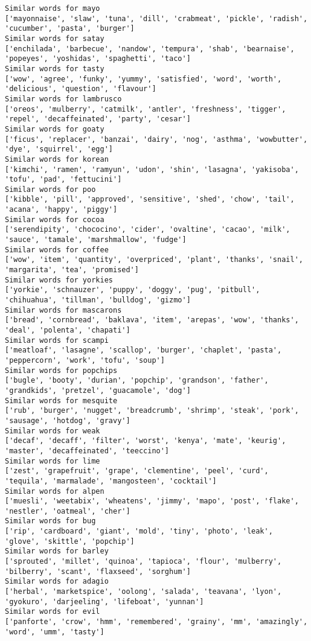 \documentclass[11pt]{article}
\begin{document}
\begin{Verbatim}[commandchars=\\\{\}]
Similar words for mayo
['mayonnaise', 'slaw', 'tuna', 'dill', 'crabmeat', 'pickle', 'radish', 'cucumber', 'pasta', 'burger']
Similar words for satay
['enchilada', 'barbecue', 'nandow', 'tempura', 'shab', 'bearnaise', 'popeyes', 'yoshidas', 'spaghetti', 'taco']
Similar words for tasty
['wow', 'agree', 'funky', 'yummy', 'satisfied', 'word', 'worth', 'delicious', 'question', 'flavour']
Similar words for lambrusco
['oreos', 'mulberry', 'catmilk', 'antler', 'freshness', 'tigger', 'repel', 'decaffeinated', 'party', 'cesar']
Similar words for goaty
['ficus', 'replacer', 'banzai', 'dairy', 'nog', 'asthma', 'wowbutter', 'dye', 'squirrel', 'egg']
Similar words for korean
['kimchi', 'ramen', 'ramyun', 'udon', 'shin', 'lasagna', 'yakisoba', 'tofu', 'pad', 'fettucini']
Similar words for poo
['kibble', 'pill', 'approved', 'sensitive', 'shed', 'chow', 'tail', 'acana', 'happy', 'piggy']
Similar words for cocoa
['serendipity', 'chococino', 'cider', 'ovaltine', 'cacao', 'milk', 'sauce', 'tamale', 'marshmallow', 'fudge']
Similar words for coffee
['wow', 'item', 'quantity', 'overpriced', 'plant', 'thanks', 'snail', 'margarita', 'tea', 'promised']
Similar words for yorkies
['yorkie', 'schnauzer', 'puppy', 'doggy', 'pug', 'pitbull', 'chihuahua', 'tillman', 'bulldog', 'gizmo']
Similar words for mascarons
['bread', 'cornbread', 'baklava', 'item', 'arepas', 'wow', 'thanks', 'deal', 'polenta', 'chapati']
Similar words for scampi
['meatloaf', 'lasagne', 'scallop', 'burger', 'chaplet', 'pasta', 'peppercorn', 'work', 'tofu', 'soup']
Similar words for popchips
['bugle', 'booty', 'durian', 'popchip', 'grandson', 'father', 'grandkids', 'pretzel', 'guacamole', 'dog']
Similar words for mesquite
['rub', 'burger', 'nugget', 'breadcrumb', 'shrimp', 'steak', 'pork', 'sausage', 'hotdog', 'gravy']
Similar words for weak
['decaf', 'decaff', 'filter', 'worst', 'kenya', 'mate', 'keurig', 'master', 'decaffeinated', 'teeccino']
Similar words for lime
['zest', 'grapefruit', 'grape', 'clementine', 'peel', 'curd', 'tequila', 'marmalade', 'mangosteen', 'cocktail']
Similar words for alpen
['muesli', 'weetabix', 'wheatens', 'jimmy', 'mapo', 'post', 'flake', 'nestler', 'oatmeal', 'cher']
Similar words for bug
['rip', 'cardboard', 'giant', 'mold', 'tiny', 'photo', 'leak', 'glove', 'skittle', 'popchip']
Similar words for barley
['sprouted', 'millet', 'quinoa', 'tapioca', 'flour', 'mulberry', 'bilberry', 'scant', 'flaxseed', 'sorghum']
Similar words for adagio
['herbal', 'marketspice', 'oolong', 'salada', 'teavana', 'lyon', 'gyokuro', 'darjeeling', 'lifeboat', 'yunnan']
Similar words for evil
['panforte', 'crow', 'hmm', 'remembered', 'grainy', 'mm', 'amazingly', 'word', 'umm', 'tasty']

\end{Verbatim}
\end{document}
